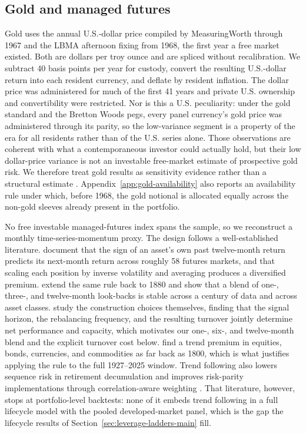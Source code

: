 \documentclass[11pt]{article}
\begin{document}
\subsection{Gold and managed futures}

Gold uses the annual U.S.-dollar price compiled by MeasuringWorth
\citep{OfficerWilliamsonMeasuringWorth} through 1967 and the LBMA afternoon
fixing \citep{LBMA} from 1968, the first year a free market existed. Both are
dollars per troy ounce and are spliced without recalibration. We subtract 40
basis points per year for custody, convert the resulting U.S.-dollar return
into each resident currency, and deflate by resident inflation. The dollar
price was administered for much of the first 41 years and private U.S.
ownership and convertibility were restricted. Nor is this a U.S. peculiarity:
under the gold standard and the Bretton Woods pegs, every panel currency's
gold price was administered through its parity, so the low-variance segment
is a property of the era for all residents rather than of the U.S. series
alone. Those
observations are coherent with what a contemporaneous investor could actually
hold, but their low
dollar-price variance is not an investable free-market estimate of prospective
gold risk. We therefore treat gold results as sensitivity evidence rather than
a structural estimate \citep{ErbHarvey2013}. Appendix~\ref{app:gold-availability}
also reports an availability rule under which, before 1968, the gold notional is
allocated equally across the non-gold sleeves already present in the portfolio.

No free investable managed-futures index spans the sample, so we reconstruct a
monthly time-series-momentum proxy. The design follows a well-established
literature. \citet{MoskowitzOoiPedersen2012} document that the sign of an
asset's own past twelve-month return predicts its next-month return across
roughly 58 futures markets, and that scaling each position by inverse
volatility and averaging produces a diversified premium. \citet{HurstOoiPedersen2017}
extend the same rule back to 1880 and show that a blend of one-, three-, and
twelve-month look-backs is stable across a century of data and across asset
classes. \citet{BaltasKosowski2020} study the construction choices themselves,
finding that the signal horizon, the rebalancing frequency, and the resulting
turnover jointly determine net performance and capacity, which motivates our
one-, six-, and twelve-month blend and the explicit turnover cost below.
\citet{LempiereEtAl2014} find a trend premium in equities, bonds, currencies,
and commodities as far back as 1800, which is what justifies applying the rule to
the full 1927--2025 window. Trend following also lowers sequence risk in
retirement decumulation \citep{ClareSeatonSmithThomas2017,ClareSeatonSmithThomas2019}
and improves risk-parity implementations through correlation-aware weighting
\citep{Baltas2015}. That literature, however, stops at portfolio-level
backtests: none of it embeds trend following in a full lifecycle model with
the pooled developed-market panel, which is the gap the lifecycle results of
Section~\ref{sec:leverage-ladders-main} fill.
\end{document}
